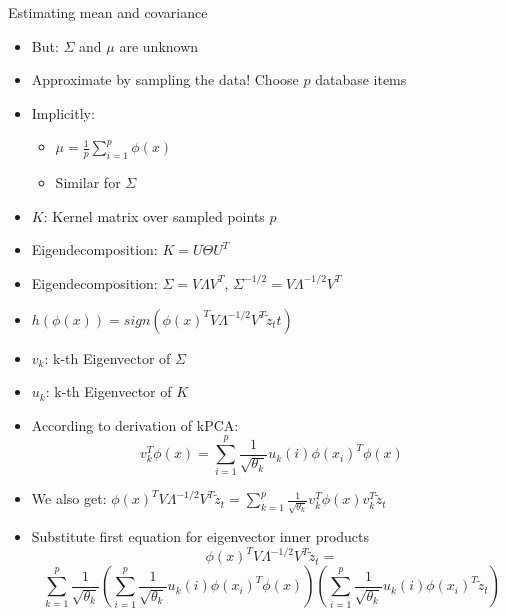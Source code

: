 \documentclass[12pt,a4paper]{beamer}
\begin{document}
\begin{frame}{Estimating mean and covariance}
\begin{itemize}
\item But: $\Sigma$ and $\mu$ are unknown
\item Approximate by sampling the data! Choose $p$ database items
\item Implicitly:
    \begin{itemize}
    \item $\mu = \frac{1}{p}\sum_{i=1}^{p}\phi(x)$
    \item Similar for $\Sigma$
    \end{itemize}
\end{itemize}
\end{frame}


\begin{frame}
\begin{itemize}
\item $K$: Kernel matrix over sampled points $p$
\item Eigendecomposition: $K=U \Theta U^{T}$
\item Eigendecomposition: $ \Sigma = V \Lambda V^{T} $, $ \Sigma^{-1/2} = V \Lambda^{-1/2} V^{T}$
\item $h(\phi(x)) = sign(\phi(x)^T V \Lambda^{-1/2} V^{T} \tilde z_t{t})$
\item $v_{k}$: k-th Eigenvector of $\Sigma$
\item $u_{k}$: k-th Eigenvector of $K$
\end{itemize}
\end{frame}

\begin{frame}
\begin{itemize}
\item According to derivation of kPCA:
$$ v_{k}^{T} \phi (x) = \sum_{i=1}^{p}  \frac{1}{ \sqrt{ \theta_{k} } } u_{k}(i) \phi (x_{i})^{T} \phi (x)  $$
\item We also get: $ \phi(x)^{T} V \Lambda^{-1/2} V^{T} \tilde z_{t} = \sum_{k=1}^{p} \frac{1}{\sqrt{\theta_{k}}} v_{k}^{T} \phi(x) v_{k}^{T} \tilde z_{t} $
\item Substitute first equation for eigenvector inner products
$$ \phi(x)^{T} V \Lambda^{-1/2} V^{T} \tilde z_{t} = $$
$$\sum_{k=1}^{p} \frac{1}{\sqrt{\theta_{k}}} 
(\sum_{i=1}^{p} \frac{1}{ \sqrt{\theta_{k}} } u_{k}(i) \phi (x_{i})^{T} \phi (x) )
(\sum_{i=1}^{p} \frac{1}{ \sqrt{\theta_{k}} } u_{k}(i) \phi (x_{i})^{T} \tilde z_{t}  )
$$
\end{itemize}
\end{frame}
\end{document}
